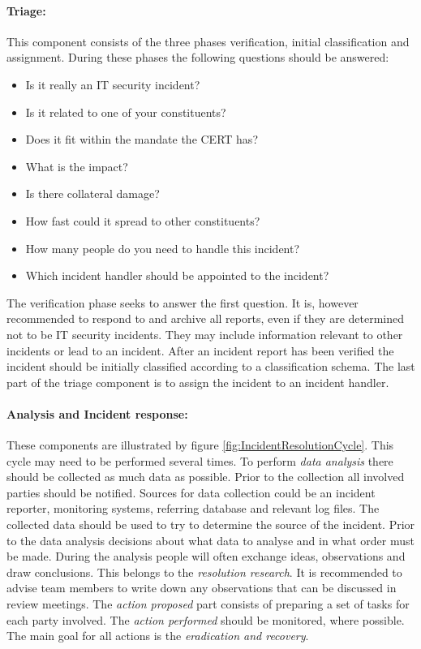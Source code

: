 \paragraph{Triage:} This component consists of the three phases verification, initial classification and assignment. During these phases the following questions should be answered:
\begin{itemize}\itemsep-0.2cm
\item Is it really an IT security incident?
\item Is it related to one of your constituents?
\item Does it fit within the mandate the \ac{CERT} has?
\item What is the impact?
\item Is there collateral damage?
\item How fast could it spread to other constituents?
\item How many people do you need to handle this incident?
\item Which incident handler should be appointed to the incident?
\end{itemize}
The verification phase seeks to answer the first question. It is, however recommended to respond to and archive all reports, even if they are determined not to be IT security incidents. They may include information relevant to other incidents or lead to an incident. After an incident report has been verified the incident should be initially classified according to a classification schema. The last part of the triage component is to assign the incident to an incident handler.

\paragraph{Analysis and Incident response:} These components are illustrated by figure \ref{fig:IncidentResolutionCycle}. This cycle may need to be performed several times. To perform \textit{data analysis} there should be collected as much data as possible. Prior to the collection all involved parties should be notified. Sources for data collection could be an incident reporter, monitoring systems, referring database and relevant log files. The collected data should be used to try to determine the source of the incident. Prior to the data analysis decisions about what data to analyse and in what order must be made. During the analysis people will often exchange ideas, observations and draw conclusions. This belongs to the \textit{resolution research}. It is recommended to advise team members to write down any observations that can be discussed in review meetings. The \textit{action proposed} part consists of preparing a set of tasks for each party involved. The \textit{action performed} should be monitored, where possible. The main goal for all actions is the \textit{eradication and recovery}.

